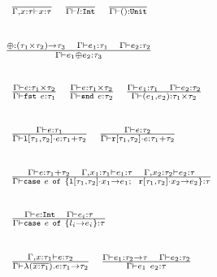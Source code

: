
\begin{center}
\(\begin{array}{c c c}
\frac{}{\Der{\Gamma,x : \tau}{x : \tau}}
 	 & 
\frac{}{\Der{\Gamma}{l : \text{\lst{Int}}}}
     &
\frac{}{\Der{\Gamma}{() : \text{\lst{Unit}}}}
	 \\
	 & & \\
\end{array}\) 

\(
\frac{\oplus : (\tau_1\times\tau_2) \to \tau_3~~~\Gamma\vdash e_1 : \tau_1~~~\Gamma\vdash e_2 : \tau_2}{\Gamma\vdash e_1 \oplus e_2 : \tau_3}
\)

\(\begin{array}{c c c}
 & \\
\frac{\DerEnv{e : \TPair{\tau_1}{\tau_2}}}{\DerEnv{\Fst{e} : \tau_1}}
     &
\frac{\DerEnv{e : \TPair{\tau_1}{\tau_2}}}{\DerEnv{\Snd{e} : \tau_2}}
     &
\frac{\DerEnv{e_1 : \tau_1}~~~\DerEnv{e_2 : \tau_2}}{\DerEnv{\Tup{e_1,e_2} : \TPair{\tau_1}{\tau_2}}}
	 \\
\end{array}\) 

\(\begin{array}{c c}
 & \\
\frac{\DerEnv{e : \tau_1}}{\DerEnv{\Left{\tau_1}{\tau_2}{e} : \tau_1 + \tau_2}}
     &
\frac{\DerEnv{e : \tau_2}}{\DerEnv{\Right{\tau_1}{\tau_2}{e} : \tau_1 + \tau_2}}
	 \\
	& \\ 
\end{array}\) 

\(\begin{array}{c}
\frac{\DerEnv{e : \tau_1 + \tau_2}~~~\Der{\Gamma,x_1 : \tau_1}{e_1 : \tau}~~~\Der{\Gamma,x_2 : \tau_2}{e_2 : \tau}}
     {\DerEnv{\CaseOfXX{e}{\Left{\tau_1}{\tau_2}{x_1} \to e_1;~~\Right{\tau_1}{\tau_2}{x_2} \to e_2} : \tau}} \\
  \\
\end{array}\) 

\(\begin{array}{c}
\frac{\DerEnv{e : \text{\lst{Int}}}~~~\DerEnv{e_i : \tau}}
     {\DerEnv{\CaseOf{e}{l_i}{e_i} : \tau}} \\
  \\
\end{array}\)


\(\begin{array}{c c}
\frac{\Gamma,x:\tau_1\vdash e:\tau_2}{\Gamma\vdash\lambda(\overline{x:\tau_1}).e : \tau_1 \to \tau_2}
 	 & 
\frac{\Gamma\vdash e_1 : \tau_2 \to \tau~~~\Gamma\vdash e_2 : \tau_2}{\Gamma\vdash e_1~e_2 : \tau}
	 \\
\end{array}\) 

\end{center}


